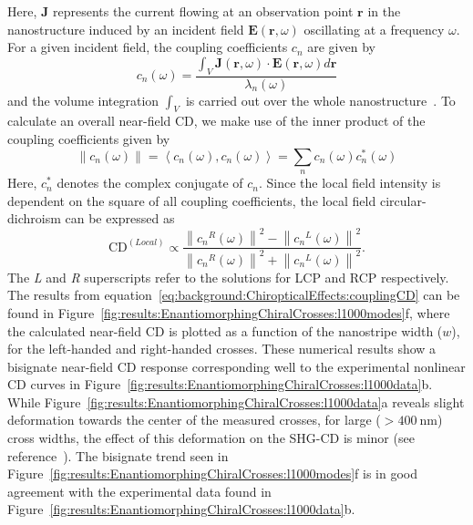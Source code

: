 Here, $\mathbf{J}$ represents the current flowing at an observation point $\mathbf{r}$ in the nanostructure induced by an incident field $\mathbf{E}(\mathbf{r}, \omega)$ oscillating at a frequency $\omega$. For a given incident field, the coupling coefficients $c_n$ are given by
\begin{equation}\label{eq:background:ChiropticalEffects:couplingCoefficients}	
	c_n(\omega) = \frac{\int_{V} \mathbf{J}(\mathbf{r}, \omega) \cdot \mathbf{E}(\mathbf{r}, \omega) d\mathbf{r}}{\lambda_{n}(\omega)}
\end{equation}
and the volume integration $\int_{V}$ is carried out over the whole nanostructure~\cite{Zheng2013}. 
To calculate an overall near-field CD, we make use of the inner product of the coupling coefficients given by
\begin{equation}\label{eq:background:ChiropticalEffects:couplingInnerProduct}	
	\left\| c_{n}(\omega ) \right\| = \left\langle c_{n}(\omega),c_{n}(\omega) \right\rangle = \sum\limits_n c_{n}(\omega) c_{n}^* (\omega)
\end{equation}
Here, $c_{n}^*$ denotes the complex conjugate of $c_{n}$.
Since the local field intensity is dependent on the square of all coupling coefficients, the local field circular-dichroism can be expressed as
\begin{equation}\label{eq:background:ChiropticalEffects:couplingCD}	
	\mathrm{CD}^{(Local)} \propto \frac{{\left\| {{c_n}^R(\omega )} \right\|}^2 - {\left\| {{c_n}^L(\omega )} \right\|}^2}{{\left\| {{c_n}^R(\omega )} \right\|}^2 + {\left\| {{c_n}^L(\omega )} \right\|}^2}.
\end{equation}
The \textit{L} and \textit{R} superscripts refer to the solutions for LCP and RCP respectively. 
The results from equation~\ref{eq:background:ChiropticalEffects:couplingCD} can be found in Figure~\ref{fig:results:EnantiomorphingChiralCrosses:l1000modes}f, where the calculated near-field CD is plotted as a function of the nanostripe width ($w$), for the left-handed and right-handed crosses. These numerical results show a bisignate near-field CD response corresponding well to the experimental nonlinear CD curves in Figure~\ref{fig:results:EnantiomorphingChiralCrosses:l1000data}b. 
While Figure~\ref{fig:results:EnantiomorphingChiralCrosses:l1000data}a reveals slight deformation towards the center of the measured crosses, for large ($>\SI{400}{\nano\m}$) cross widths, the effect of this deformation on the SHG-CD is minor (see reference~\cite{Valev2014}). 
The bisignate trend seen in Figure~\ref{fig:results:EnantiomorphingChiralCrosses:l1000modes}f is in good agreement with the experimental data found in Figure~\ref{fig:results:EnantiomorphingChiralCrosses:l1000data}b.


